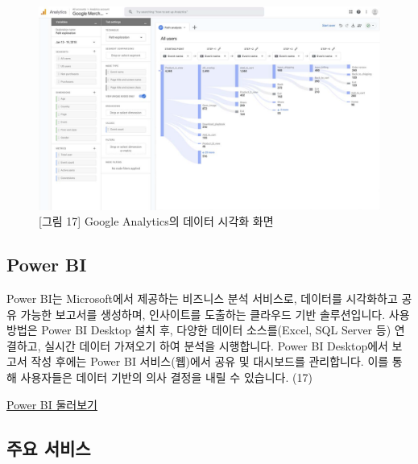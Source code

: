 \documentclass[
  letterpaper,
]{book}
\begin{document}
\begin{itemize}
  \begin{figure}[H]

  {\centering \includegraphics{img/fig17.png}

  }

  \caption{{[}그림 17{]} Google Analytics의 데이터 시각화 화면}

  \end{figure}%
\end{itemize}

\subsection{Power BI}\label{power-bi}

Power BI는 Microsoft에서 제공하는 비즈니스 분석 서비스로, 데이터를
시각화하고 공유 가능한 보고서를 생성하며, 인사이트를 도출하는 클라우드
기반 솔루션입니다. 사용 방법은 Power BI Desktop 설치 후, 다양한 데이터
소스를(Excel, SQL Server 등) 연결하고, 실시간 데이터 가져오기 하여
분석을 시행합니다. Power BI Desktop에서 보고서 작성 후에는 Power BI
서비스(웹)에서 공유 및 대시보드를 관리합니다. 이를 통해 사용자들은
데이터 기반의 의사 결정을 내릴 수 있습니다. (17)

\href{https://powerbi.microsoft.com/ko-kr/guidedtour/power-platform/power-bi/2/1}{Power
BI 둘러보기}

\subsection{주요 서비스}\label{uxc8fcuxc694-uxc11cuxbe44uxc2a4-1}
\end{document}
